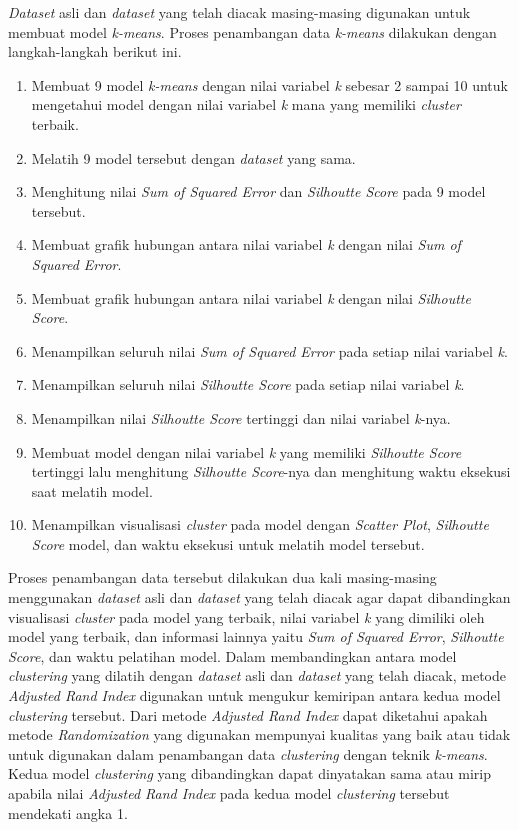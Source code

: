 \textit{Dataset} asli dan \textit{dataset} yang telah diacak masing-masing digunakan untuk membuat model \textit{k-means}. Proses penambangan data \textit{k-means} dilakukan dengan langkah-langkah berikut ini.
\begin{enumerate}
    \item Membuat 9 model \textit{k-means} dengan nilai variabel \textit{k} sebesar 2 sampai 10 untuk mengetahui model dengan nilai variabel \textit{k} mana yang memiliki \textit{cluster} terbaik.
    \item Melatih 9 model tersebut dengan \textit{dataset} yang sama.
    \item Menghitung nilai \textit{Sum of Squared Error} dan \textit{Silhoutte Score} pada 9 model tersebut.
    \item Membuat grafik hubungan antara nilai variabel \textit{k} dengan nilai \textit{Sum of Squared Error}.
    \item Membuat grafik hubungan antara nilai variabel \textit{k} dengan nilai \textit{Silhoutte Score}.
    \item Menampilkan seluruh nilai \textit{Sum of Squared Error} pada setiap nilai variabel \textit{k}.
    \item Menampilkan seluruh nilai \textit{Silhoutte Score} pada setiap nilai variabel \textit{k}.
    \item Menampilkan nilai \textit{Silhoutte Score} tertinggi dan nilai variabel \textit{k}-nya.
    \item Membuat model dengan nilai variabel \textit{k} yang memiliki \textit{Silhoutte Score} tertinggi lalu menghitung \textit{Silhoutte Score}-nya dan menghitung waktu eksekusi saat melatih model.
    \item Menampilkan visualisasi \textit{cluster} pada model dengan \textit{Scatter Plot}, \textit{Silhoutte Score} model, dan waktu eksekusi untuk melatih model tersebut.
\end{enumerate}
Proses penambangan data tersebut dilakukan dua kali masing-masing menggunakan \textit{dataset} asli dan \textit{dataset} yang telah diacak agar dapat dibandingkan visualisasi \textit{cluster} pada model yang terbaik, nilai variabel \textit{k} yang dimiliki oleh model yang terbaik, dan informasi lainnya yaitu \textit{Sum of Squared Error}, \textit{Silhoutte Score}, dan waktu pelatihan model. Dalam membandingkan antara model \textit{clustering} yang dilatih dengan \textit{dataset} asli dan \textit{dataset} yang telah diacak, metode \textit{Adjusted Rand Index} digunakan untuk mengukur kemiripan antara kedua model \textit{clustering} tersebut. Dari metode \textit{Adjusted Rand Index} dapat diketahui apakah metode \textit{Randomization} yang digunakan mempunyai kualitas yang baik atau tidak untuk digunakan dalam penambangan data \textit{clustering} dengan teknik \textit{k-means}. Kedua model \textit{clustering} yang dibandingkan dapat dinyatakan sama atau mirip apabila nilai \textit{Adjusted Rand Index} pada kedua model \textit{clustering} tersebut mendekati angka 1.

